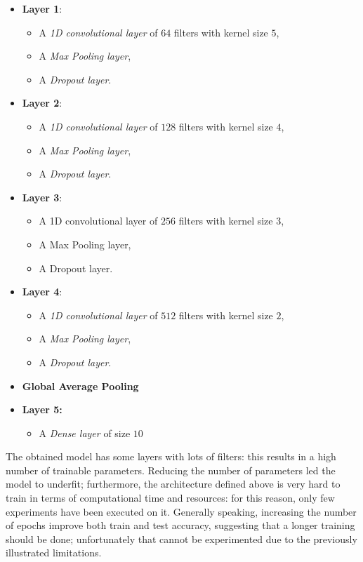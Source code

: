 \documentclass[oneside,openany]{article}
\begin{document}
    \begin{itemize}
    \item \textbf{Layer 1}:
    \begin{itemize}
        \item A \textit{1D convolutional layer} of $64$ filters with kernel size $5$,
        \item A \textit{Max Pooling layer},
        \item A \textit{Dropout layer}.
    \end{itemize}
    
    \item \textbf{Layer 2}:
    \begin{itemize}
        \item A \textit{1D convolutional layer} of $128$ filters with kernel size $4$,
        \item A \textit{Max Pooling layer},
        \item A \textit{Dropout layer}.
    \end{itemize}
    \item \textbf{Layer 3}:
    \begin{itemize}
        \item A 1D convolutional layer of $256$ filters with kernel size $3$,
        \item A Max Pooling layer,
        \item A Dropout layer.
    \end{itemize}
    \item \textbf{Layer 4}:
    \begin{itemize}
        \item A \textit{1D convolutional layer} of $512$ filters with kernel size $2$,
        \item A \textit{Max Pooling layer},
        \item A \textit{Dropout layer}.
    \end{itemize}
    \item \textbf{Global Average Pooling}
    \item \textbf{Layer 5:}
    \begin{itemize}
        \item A \textit{Dense layer} of size $10$
    \end{itemize}
    \end{itemize}
    The obtained model has some layers with lots of filters: this results in a high number of trainable parameters. Reducing the number of parameters led the model to underfit; furthermore, the architecture defined above is very hard to train in terms of computational time and resources: for this reason, only few experiments have been executed on it. Generally speaking, increasing the number of epochs improve both train and test accuracy, suggesting that a longer training should be done; unfortunately that cannot be experimented due to the previously illustrated limitations.\\
\end{document}
